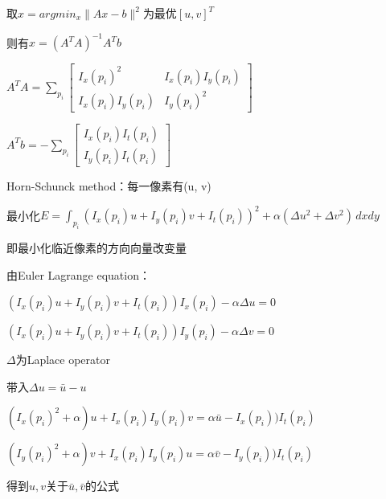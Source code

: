 \documentclass[UTF8]{ctexart}
\begin{document}
  \quad 取$x = argmin_x\|Ax - b\|^2$为最优$[u, v]^T$

  \quad 则有$x = (A^TA)^{-1}A^Tb$

  \quad \quad $A^TA = \sum_{p_i}
    \begin{bmatrix}
      I_x(p_i)^2 & I_x(p_i)I_y(p_i) \\ 
      I_x(p_i)I_y(p_i) & I_y(p_i)^2
      \end{bmatrix}$

  \quad \quad $A^Tb = - \sum_{p_i}
    \begin{bmatrix}
      I_x(p_i)I_t(p_i) \\ 
      I_y(p_i)I_t(p_i)
      \end{bmatrix}$







  Horn-Schunck method：每一像素有(u, v)

  \quad 最小化$E = \int_{p_i} (I_x(p_i)u + I_y(p_i)v + I_t(p_i))^2 + \alpha (\Delta u^2 + \Delta v^2) \,dxdy $

  \quad \quad 即最小化临近像素的方向向量改变量

  \quad 由Euler Lagrange equation：

  \quad \quad $(I_x(p_i)u + I_y(p_i)v + I_t(p_i))I_x(p_i) - \alpha\Delta u = 0$
  
  \quad \quad $(I_x(p_i)u + I_y(p_i)v + I_t(p_i))I_y(p_i) - \alpha\Delta v = 0$
 
  \quad \quad \quad $\Delta$为Laplace operator

  \quad 带入$\Delta u = \bar{u} - u$

  \quad \quad $(I_x(p_i)^2 + \alpha)u + I_x(p_i)I_y(p_i)v = \alpha \bar{u} - I_x(p_i))I_t(p_i)$
  
  \quad \quad $(I_y(p_i)^2 + \alpha)v + I_x(p_i)I_y(p_i)u = \alpha \bar{v} - I_y(p_i))I_t(p_i)$

  \quad 得到$u, v$关于$\bar{u}, \bar{v}$的公式
\end{document}
